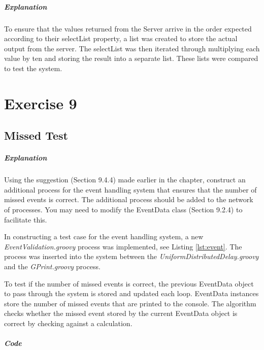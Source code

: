 \documentclass[10pt, a4paper]{article}
\begin{document}
   \subparagraph{Explanation}
   
   To ensure that the values returned from the Server arrive in the order expected according to their selectList property, a list was created to store the actual output from the server. The selectList was then iterated through multiplying each value by ten and storing the result into a separate list. These lists were compared to test the system.
   
   \setcounter{section}{9}
   \section*{Exercise 9}
   
   \setcounter{subsection}{0}
   \subsection{Missed Test}

   \subparagraph{Explanation}
   Using the suggestion (Section 9.4.4) made earlier in the chapter, construct an additional process for the event handling system that ensures that the number of missed events is correct.  The additional process should be added to the network of processes.  You may need to modify the EventData class (Section 9.2.4) to facilitate this.
   
   In constructing a test case for the event handling system, a new \textit{EventValidation.groovy} process was implemented, see Listing \ref{lst:event}. The process was inserted into the system between the \textit{UniformDistributedDelay.groovy} and the \textit{GPrint.groovy} process.
   
   To test if the number of missed events is correct, the previous EventData object to pass through the system is stored and updated each loop. EventData instances store the number of missed events that are printed to the console. The algorithm checks whether the missed event stored by the current EventData object is correct by checking against a calculation.
   
   
   \subparagraph{Code} \hfill
   
\end{document}
